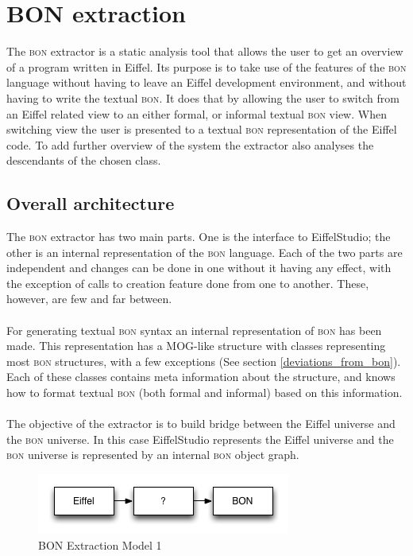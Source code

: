 \section{BON extraction}
The \textsc{bon} extractor is a static analysis tool that allows the user to get an overview of a program written in Eiffel. Its purpose is to take use of the features of the \textsc{bon} language without having to leave an Eiffel development environment, and without having to write the textual \textsc{bon}. It does that by allowing the user to switch from an Eiffel related view to an either formal, or informal textual \textsc{bon} view. When switching view the user is presented to a textual \textsc{bon} representation of the Eiffel code. To add further overview of the system the extractor also analyses the descendants of the chosen class.

\subsection{Overall architecture}
The \textsc{bon} extractor has two main parts. One is the interface to EiffelStudio; the other is an internal representation of the \textsc{bon} language. Each of the two parts are independent and changes can be done in one without it having any effect, with the exception of calls to creation feature done from one to another. These, however, are few and far between. 

\paragraph{}
For generating textual \textsc{bon} syntax an internal representation of \textsc{bon} has been made. This representation has a MOG-like structure with classes representing most \textsc{bon} structures, with a few exceptions (See section \ref{deviations_from_bon}).  Each of these classes contains meta information about the structure, and knows how to format textual \textsc{bon} (both formal and informal) based on this information. 

\paragraph{}
The objective of the extractor is to build bridge between the Eiffel universe and the \textsc{bon} universe.  In this case EiffelStudio represents the Eiffel universe and the \textsc{bon} universe is represented by an internal \textsc{bon} object graph.
\begin{figure}[H]
\centering
\includegraphics[scale=0.8]{images/BON-extraction-model-1.png}
\caption{BON Extraction Model 1}
\label{fig:bon_extraction_1}
\end{figure}

